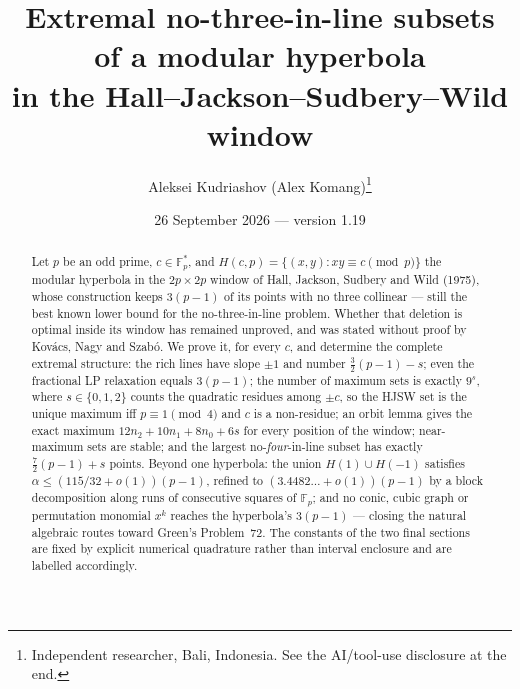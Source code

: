 \documentclass[11pt]{article}
\title{Extremal no-three-in-line subsets of a modular hyperbola\\ in the Hall--Jackson--Sudbery--Wild window}
\author{Aleksei Kudriashov (Alex Komang)\thanks{Independent researcher, Bali, Indonesia.  See the AI/tool-use disclosure at the end.}}
\date{26 September 2026 --- version 1.19}
\theoremstyle{remark}
\newcommand{\Fp}{\mathbb{F}_p}
\newcommand{\Hc}{H(c,p)}
\begin{document}
\maketitle

\begin{abstract}
Let $p$ be an odd prime, $c\in\Fp^*$, and $\Hc=\{(x,y):xy\equiv c\pmod p\}$ the modular hyperbola in the
$2p\times2p$ window of Hall, Jackson, Sudbery and Wild (1975), whose construction keeps $3(p-1)$ of its points
with no three collinear --- still the best known lower bound for the no-three-in-line problem.  Whether that
deletion is optimal inside its window has remained unproved, and was stated without proof by Kov\'acs, Nagy and
Szab\'o.  We prove it, for every $c$, and determine the complete extremal structure: the rich lines have slope
$\pm1$ and number $\tfrac32(p-1)-s$; even the fractional LP relaxation equals $3(p-1)$; the number of maximum
sets is exactly $9^s$, where $s\in\{0,1,2\}$ counts the quadratic residues among $\pm c$, so the HJSW set is the
unique maximum iff $p\equiv1\pmod4$ and $c$ is a non-residue; an orbit lemma gives the exact maximum
$12n_2+10n_1+8n_0+6s$ for every position of the window; near-maximum sets are stable; and the largest
no-\emph{four}-in-line subset has exactly $\tfrac72(p-1)+s$ points.  Beyond one hyperbola: the union
$H(1)\cup H(-1)$ satisfies $\alpha\le(115/32+o(1))(p-1)$, refined to $(3.4482\ldots+o(1))(p-1)$ by a block
decomposition along runs of consecutive squares of $\Fp$; and no conic, cubic graph or permutation monomial
$x^k$ reaches the hyperbola's $3(p-1)$ --- closing the natural algebraic routes toward Green's Problem~72.
The constants of the two final sections are fixed by explicit numerical quadrature rather than interval
enclosure and are labelled accordingly.
\end{abstract}
\end{document}
